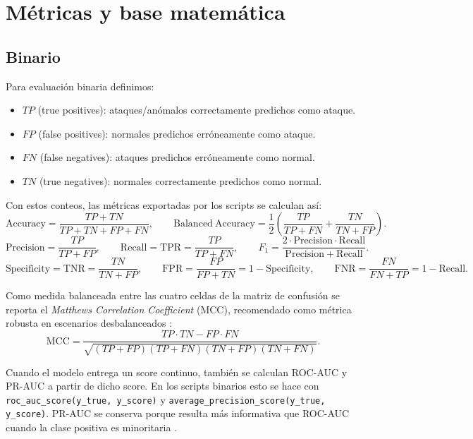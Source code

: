 \documentclass[12pt,oneside]{report}
\begin{document}
\section{Métricas y base matemática}
\subsection{Binario}
Para evaluación binaria definimos:
\begin{itemize}[leftmargin=*]
  \item $TP$ (true positives): ataques/anómalos correctamente predichos como ataque.
  \item $FP$ (false positives): normales predichos erróneamente como ataque.
  \item $FN$ (false negatives): ataques predichos erróneamente como normal.
  \item $TN$ (true negatives): normales correctamente predichos como normal.
\end{itemize}

Con estos conteos, las métricas exportadas por los scripts se calculan así:
\[
\mathrm{Accuracy}=\frac{TP+TN}{TP+TN+FP+FN},\qquad
\mathrm{Balanced\ Accuracy}=\frac{1}{2}\left(\frac{TP}{TP+FN}+\frac{TN}{TN+FP}\right).
\]
\[
\mathrm{Precision}=\frac{TP}{TP+FP},\qquad
\mathrm{Recall}=\mathrm{TPR}=\frac{TP}{TP+FN},\qquad
F_1=\frac{2\cdot \mathrm{Precision}\cdot \mathrm{Recall}}{\mathrm{Precision}+\mathrm{Recall}}.
\]
\[
\mathrm{Specificity}=\mathrm{TNR}=\frac{TN}{TN+FP},\qquad
\mathrm{FPR}=\frac{FP}{FP+TN}=1-\mathrm{Specificity},\qquad
\mathrm{FNR}=\frac{FN}{FN+TP}=1-\mathrm{Recall}.
\]

Como medida balanceada entre las cuatro celdas de la matriz de confusión se reporta el \textit{Matthews Correlation Coefficient} (MCC),
recomendado como métrica robusta en escenarios desbalanceados \cite{chicco_mcc}:
\[
\mathrm{MCC}=\frac{TP\cdot TN - FP\cdot FN}{\sqrt{(TP+FP)(TP+FN)(TN+FP)(TN+FN)}}.
\]

Cuando el modelo entrega un score continuo, también se calculan ROC-AUC y PR-AUC a partir de dicho score. En los scripts binarios esto se hace con
\texttt{roc\_auc\_score(y\_true, y\_score)} y \texttt{average\_precision\_score(y\_true, y\_score)}. PR-AUC se conserva porque resulta más informativa que ROC-AUC cuando la clase positiva es minoritaria \cite{saito_pr_auc}.
\end{document}
